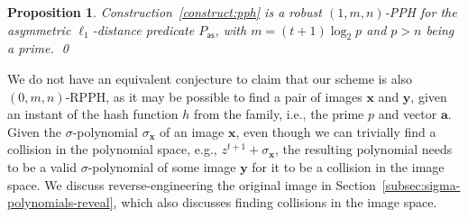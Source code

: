 \documentclass[pdflatex,sn-mathphys-num]{sn-jnl}
\newtheorem{proposition}{Proposition}
\theoremstyle{definition}
\newcommand{\vtr}[1]{\mathbf{#1}}
\begin{document}
\begin{proposition}
\label{prop:scheme-is-rpph}
Construction~\ref{construct:pph} is a robust $(1, m, n)$-PPH for the asymmetric $\ell_1$-distance predicate $P_{\mathsf{as}}$, with $m = (t + 1) \log_2 p$ and $p > n$ being a prime. \qed
\end{proposition}
We do not have an equivalent conjecture to claim that our scheme is also $(0, m, n)$-RPPH, as it may be possible to find a pair of images $\vtr{x}$ and $\vtr{y}$, given an instant of the hash function $h$ from the family, i.e., the prime $p$ and vector $\vtr{a}$. Given the $\sigma$-polynomial $\sigma_{\vtr{x}}$ of an image $\vtr{x}$, even though we can trivially find a collision in the polynomial space, e.g., $z^{t+1} + \sigma_\vtr{x}$, the resulting polynomial needs to be a valid $\sigma$-polynomial of some image $\vtr{y}$ for it to be a collision in the image space. We discuss reverse-engineering the original image in Section~\ref{subsec:sigma-polynomials-reveal}, which also discusses finding collisions in the image space.  
\end{document}

